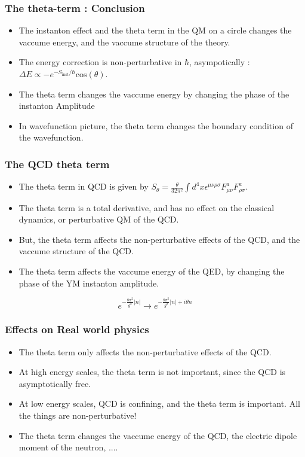 \documentclass[10pt]{beamer}
\begin{document}
\begin{frame}
    \frametitle{The theta-term : Conclusion}
    \begin{itemize}
    \item The instanton effect and the theta term in the QM on a circle changes the vaccume energy, and the vaccume structure of the theory.
    \item The energy correction is non-perturbative in $\hbar$, asympotically : $\Delta E \propto -e^{-S_{\text{inst}}/\hbar}\text{cos}(\theta)$.
    \item The theta term changes the vaccume energy by changing the phase of the instanton Amplitude
    \item In wavefunction picture, the theta term changes the boundary condition of the wavefunction.
    \end{itemize}
\end{frame}

\begin{frame}
    \frametitle{The QCD theta term}
    \begin{itemize}
    \item The theta term in QCD is given by $S_{\theta} = \frac{\theta}{32\pi^2}\int d^4x \epsilon^{\mu\nu\rho\sigma}F_{\mu\nu}^a F_{\rho\sigma}^a$.
    \item The theta term is a total derivative, and has no effect on the classical dynamics, or perturbative QM of the QCD.
    \item But, the theta term affects the non-perturbative effects of the QCD, and the vaccume structure of the QCD.
    \item The theta term affects the vaccume energy of the QED, by changing the phase of the YM instanton amplitude.
    \end{itemize}
    \begin{equation}
        e^{-\frac{8\pi^2}{g^2}|n|} \rightarrow e^{-\frac{8\pi^2}{g^2}|n| + i\theta n}
    \end{equation}
\end{frame}

\begin{frame}
    \frametitle{Effects on Real world physics}
    \begin{itemize}
    \item The theta term only affects the non-perturbative effects of the QCD.
    \item At high energy scales, the theta term is not important, since the QCD is asymptotically free.
    \item At low energy scales, QCD is confining, and the theta term is important. All the things are non-perturbative!
    \item The theta term changes the vaccume energy of the QCD, the electric dipole moment of the neutron, ....
    \end{itemize}
\end{frame}
\end{document}
